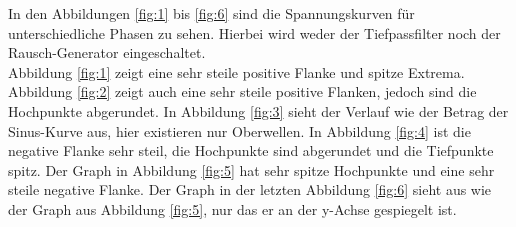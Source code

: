In den Abbildungen \ref{fig:1} bis \ref{fig:6} sind die Spannungskurven für unterschiedliche Phasen
zu sehen. Hierbei wird weder der Tiefpassfilter noch der Rausch-Generator eingeschaltet. \\
Abbildung \ref{fig:1} zeigt eine sehr steile positive Flanke und spitze Extrema. Abbildung \ref{fig:2}
zeigt auch eine sehr steile positive Flanken, jedoch sind die Hochpunkte abgerundet. In Abbildung \ref{fig:3}
sieht der Verlauf wie der Betrag der Sinus-Kurve aus, hier existieren nur Oberwellen. In Abbildung \ref{fig:4}
ist die negative Flanke sehr steil, die Hochpunkte sind abgerundet und die Tiefpunkte spitz.
Der Graph in Abbildung \ref{fig:5} hat sehr spitze Hochpunkte und eine sehr steile negative Flanke.
Der Graph in der letzten Abbildung \ref{fig:6} sieht aus wie der Graph aus Abbildung \ref{fig:5}, nur
das er an der y-Achse gespiegelt ist.

\newpage


